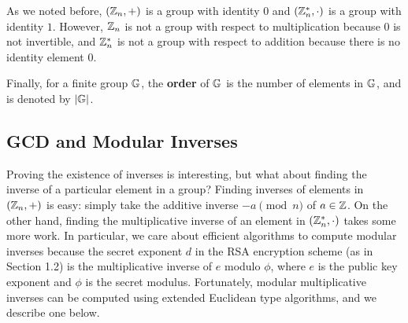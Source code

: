 As we noted before, $(\mathbb{Z}_n, +)$ is a group with identity $0$ and $(\mathbb{Z}_n^*, \cdot)$ is a group 
with identity $1$. However, $\mathbb{Z}_n$ is not a group with respect to multiplication 
because $0$ is not invertible, and 
$\mathbb{Z}_n^*$ is not a group with respect to addition because there is no identity element $0$. 

Finally, for a finite group $\mathbb{G}$, the {\bf order} of $\mathbb{G}$ is the number of elements in 
$\mathbb{G}$, and is denoted by $|\mathbb{G}|$. 

\subsection{GCD and Modular Inverses}
Proving the existence of inverses is interesting, but what about finding the inverse of a particular
element in a group? Finding inverses of elements in $(\mathbb{Z}_n, +)$ is easy: simply take the 
additive inverse $-a \pmod n$ of $a \in \mathbb{Z}$. On the other hand, finding the multiplicative 
inverse of an element in $(\mathbb{Z}_n^*, \cdot)$ takes some more work. In particular, we care about 
efficient algorithms to compute modular inverses because the secret exponent $d$ in the RSA 
encryption scheme (as in Section 1.2) is the multiplicative inverse of $e$ modulo $\phi$, where 
$e$ is the public key exponent and $\phi$ is the secret modulus. Fortunately, modular multiplicative
inverses can be computed using extended Euclidean type algorithms, and we describe one below. 

